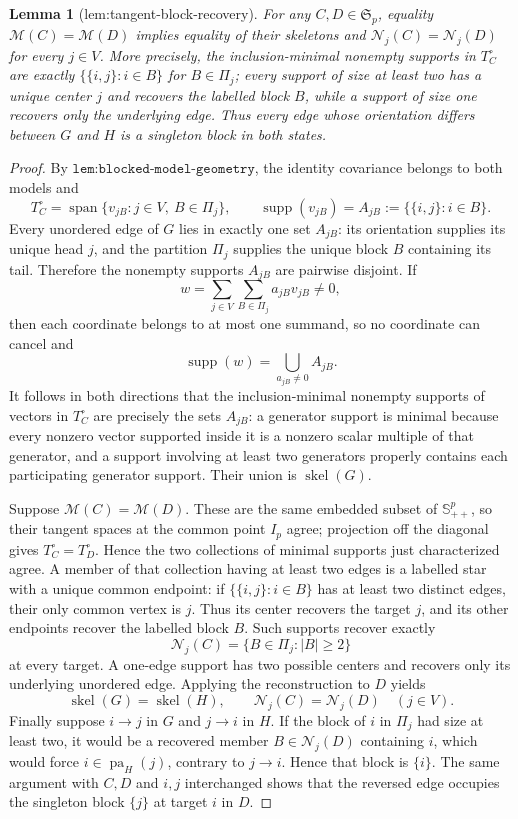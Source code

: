 \documentclass{article}
\newtheorem{lemma}{Lemma}
\begin{document}
\begin{lemma}[lem:tangent-block-recovery]\label{lem:tangent-block-recovery}
For any \(C,D\in\mathfrak S_p\), equality \(\mathcal M(C)=\mathcal M(D)\) implies equality of their skeletons and \(\mathcal N_j(C)=\mathcal N_j(D)\) for every \(j\in V\). More precisely, the inclusion-minimal nonempty supports in \(T_C^{\circ}\) are exactly \(\{\{i,j\}:i\in B\}\) for \(B\in\Pi_j\); every support of size at least two has a unique center \(j\) and recovers the labelled block \(B\), while a support of size one recovers only the underlying edge. Thus every edge whose orientation differs between \(G\) and \(H\) is a singleton block in both states.
\end{lemma}
\begin{proof}
By \(\texttt{lem:blocked-model-geometry}\), the identity covariance belongs to both models and
\[
 T_C^{\circ}=\operatorname{span}\{v_{jB}:j\in V,\ B\in\Pi_j\},
 \qquad
 \operatorname{supp}(v_{jB})=A_{jB}:=\{\{i,j\}:i\in B\}.
\]
Every unordered edge of \(G\) lies in exactly one set \(A_{jB}\): its orientation supplies its unique head \(j\), and the partition \(\Pi_j\) supplies the unique block \(B\) containing its tail. Therefore the nonempty supports \(A_{jB}\) are pairwise disjoint. If
\[
 w=\sum_{j\in V}\sum_{B\in\Pi_j}a_{jB}v_{jB}\neq0,
\]
then each coordinate belongs to at most one summand, so no coordinate can cancel and
\[
 \operatorname{supp}(w)=\bigcup_{a_{jB}\neq0}A_{jB}.
\]
It follows in both directions that the inclusion-minimal nonempty supports of vectors in \(T_C^{\circ}\) are precisely the sets \(A_{jB}\): a generator support is minimal because every nonzero vector supported inside it is a nonzero scalar multiple of that generator, and a support involving at least two generators properly contains each participating generator support. Their union is \(\operatorname{skel}(G)\).

Suppose \(\mathcal M(C)=\mathcal M(D)\). These are the same embedded subset of \(\mathbb S^p_{++}\), so their tangent spaces at the common point \(I_p\) agree; projection off the diagonal gives \(T_C^{\circ}=T_D^{\circ}\). Hence the two collections of minimal supports just characterized agree. A member of that collection having at least two edges is a labelled star with a unique common endpoint: if \(\{\{i,j\}:i\in B\}\) has at least two distinct edges, their only common vertex is \(j\). Thus its center recovers the target \(j\), and its other endpoints recover the labelled block \(B\). Such supports recover exactly
\[
 \mathcal N_j(C)=\{B\in\Pi_j:|B|\geq2\}
\]
at every target. A one-edge support has two possible centers and recovers only its underlying unordered edge. Applying the reconstruction to \(D\) yields
\[
 \operatorname{skel}(G)=\operatorname{skel}(H),
 \qquad
 \mathcal N_j(C)=\mathcal N_j(D)\quad(j\in V).
\]
Finally suppose \(i\to j\) in \(G\) and \(j\to i\) in \(H\). If the block of \(i\) in \(\Pi_j\) had size at least two, it would be a recovered member \(B\in\mathcal N_j(D)\) containing \(i\), which would force \(i\in\operatorname{pa}_H(j)\), contrary to \(j\to i\). Hence that block is \(\{i\}\). The same argument with \(C,D\) and \(i,j\) interchanged shows that the reversed edge occupies the singleton block \(\{j\}\) at target \(i\) in \(D\).
\end{proof}
\end{document}
